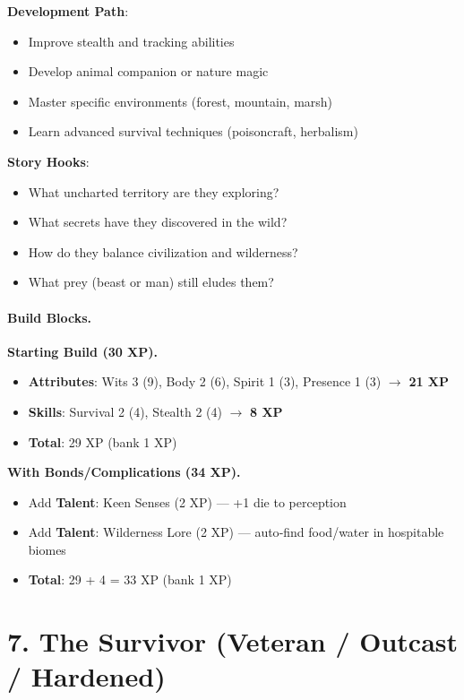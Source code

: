 \textbf{Development Path}:
\begin{itemize}
\item Improve stealth and tracking abilities
\item Develop animal companion or nature magic
\item Master specific environments (forest, mountain, marsh)
\item Learn advanced survival techniques (poisoncraft, herbalism)
\end{itemize}

\textbf{Story Hooks}:
\begin{itemize}
\item What uncharted territory are they exploring?
\item What secrets have they discovered in the wild?
\item How do they balance civilization and wilderness?
\item What prey (beast or man) still eludes them?
\end{itemize}

\paragraph{Build Blocks.}
\textbf{Starting Build (30 XP).}
\begin{itemize}
\item \textbf{Attributes}: Wits 3 (9), Body 2 (6), Spirit 1 (3), Presence 1 (3) $\rightarrow$ \textbf{21 XP}
\item \textbf{Skills}: Survival 2 (4), Stealth 2 (4) $\rightarrow$ \textbf{8 XP}
\item \textbf{Total}: 29 XP (bank 1 XP)
\end{itemize}
\textbf{With Bonds/Complications (34 XP).}
\begin{itemize}
\item Add \textbf{Talent}: Keen Senses (2 XP) — +1 die to perception
\item Add \textbf{Talent}: Wilderness Lore (2 XP) — auto‑find food/water in hospitable biomes
\item \textbf{Total}: 29 + 4 = 33 XP (bank 1 XP)
\end{itemize}

\section{7. The Survivor (Veteran / Outcast / Hardened)}
\label{sec:concept-survivor}

